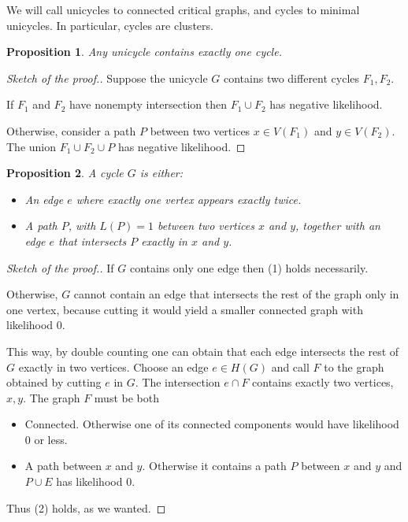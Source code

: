 \documentclass[11pt,notitlepage,a4paper]{article}
\newtheorem{proposition}{Proposition}[section]
\theoremstyle{definition}
\begin{document}
We will call unicycles to connected critical graphs, and cycles
to minimal unicycles. In particular, cycles are clusters. 

\begin{proposition}
	Any unicycle contains exactly one cycle. 
\end{proposition}
\begin{proof}[Sketch of the proof.]
 	Suppose the unicycle $G$ contains two different cycles $F_1,F_2$.
 	\item If $F_1$ and $F_2$ have nonempty intersection then $F_1\cup F_2$ 
 	has negative likelihood.
 	\item Otherwise, consider a path $P$ between two vertices $x\in V(F_1)$
 	and $y\in V(F_2)$. The union $F_1\cup F_2 \cup P$ has negative likelihood.
\end{proof}

\begin{proposition}
	A cycle $G$ is either:
	\begin{itemize}
		\item[(1)] An edge $e$ where exactly one vertex appears exactly
		twice.
		\item[(2)] A path $P$, with $L(P)=1$
		between two vertices $x$ and $y$, 
		together with an edge $e$ that intersects $P$ exactly
		in $x$ and $y$.
	\end{itemize}
\end{proposition} 
\begin{proof}[Sketch of the proof.]
	\item If $G$ contains only one edge then (1) holds necessarily.
	
	\item Otherwise, $G$ cannot contain an edge that intersects the rest of the graph
	only in one vertex, because cutting it would yield a smaller connected 
	graph with likelihood $0$. 
	
	This way, by double counting one can obtain that 
	each edge intersects the rest of $G$ exactly in two vertices.
	Choose an edge $e\in H(G)$ and call $F$ to the graph obtained by
	cutting $e$ in $G$. The intersection $e\cap F$ contains exactly two 
	vertices, $x, y$. The graph $F$ must be both
	\begin{itemize}
		\item Connected. Otherwise one of its connected components would have
		likelihood $0$ or less.
		\item A path between $x$ and $y$. Otherwise it contains a path $P$ between
		$x$ and $y$ and $P\cup E$ has likelihood $0$. 
	\end{itemize} 
	Thus (2) holds, as we wanted. 
\end{proof}
\end{document}
